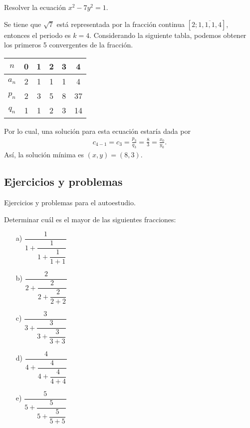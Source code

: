\begin{example}
    Resolver la ecuación $x^2 - 7y^2 = 1$.
\end{example}
\begin{solution}
    Se tiene que $\sqrt {7}$ está representada por la fracción continua $[2;\overline{1,1,1,4}]$, entonces el periodo es $k = 4$.
    Considerando la siguiente tabla, podemos obtener los primeros 5 convergentes de la fracción.
    \begin{table}[H]
        \centering
        \begin{tabular}{c||c|c|c|c|c}
            $n$ & 0 & 1 & 2 & 3 & 4 \\\hline\hline
            $a_n$ & 2 & 1 & 1 & 1 & 4\\
            $p_n$ & 2 & 3 & 5 & 8 & 37\\
            $q_n$ & 1 & 1 & 2 & 3 & 14\\
        \end{tabular}
    \end{table}
    Por lo cual, una solución para esta ecuación estaría dada por
    \begin{align*}
        c_{4 - 1} = c_3 = \frac{p_3}{q_3} = \frac{8}{3} = \frac{x_0}{y_0}.
    \end{align*}
    Así, la solución mínima es $(x,y) = (8,3)$.
\end{solution}


\subsection{Ejercicios y problemas}

Ejercicios y problemas para el autoestudio.


\begin{exercise}
    Determinar cuál es el mayor de las siguientes fracciones:
    \begin{multicols}{3}
        \begin{enumerate}
            \item[a)] $\dfrac{1}{1 + \dfrac{1}{1 + \dfrac{1}{1 + 1}}}$
            \item[b)] $\dfrac{2}{2 + \dfrac{2}{2 + \dfrac{2}{2 + 2}}}$
            \item[c)] $\dfrac{3}{3 + \dfrac{3}{3 + \dfrac{3}{3 + 3}}}$
            \item[d)] $\dfrac{4}{4 + \dfrac{4}{4 + \dfrac{4}{4 + 4}}}$
            \item[e)] $\dfrac{5}{5 + \dfrac{5}{5 + \dfrac{5}{5 + 5}}}$
        \end{enumerate}
    \end{multicols}
\end{exercise}

